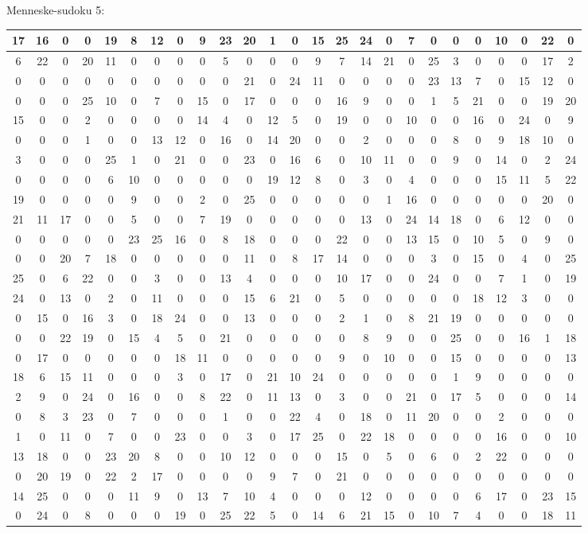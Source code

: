 \documentclass[]{report}
\begin{document}
Menneske-sudoku 5:\\
\begin{tabular}{|c|c|c|c|c||c|c|c|c|c||c|c|c|c|c||c|c|c|c|c||c|c|c|c|c|}
\hline
17&16&0&0&19&8&12&0&9&23&20&1&0&15&25&24&0&7&0&0&0&10&0&22&0\\\hline
6&22&0&20&11&0&0&0&0&5&0&0&0&9&7&14&21&0&25&3&0&0&0&17&2\\\hline
0&0&0&0&0&0&0&0&0&0&21&0&24&11&0&0&0&0&23&13&7&0&15&12&0\\\hline
0&0&0&25&10&0&7&0&15&0&17&0&0&0&16&9&0&0&1&5&21&0&0&19&20\\\hline
15&0&0&2&0&0&0&0&14&4&0&12&5&0&19&0&0&10&0&0&16&0&24&0&9\\\hline\hline
0&0&0&1&0&0&13&12&0&16&0&14&20&0&0&2&0&0&0&8&0&9&18&10&0\\\hline
3&0&0&0&25&1&0&21&0&0&23&0&16&6&0&10&11&0&0&9&0&14&0&2&24\\\hline
0&0&0&0&6&10&0&0&0&0&0&19&12&8&0&3&0&4&0&0&0&15&11&5&22\\\hline
19&0&0&0&0&9&0&0&2&0&25&0&0&0&0&0&1&16&0&0&0&0&0&20&0\\\hline
21&11&17&0&0&5&0&0&7&19&0&0&0&0&0&13&0&24&14&18&0&6&12&0&0\\\hline\hline
0&0&0&0&0&23&25&16&0&8&18&0&0&0&22&0&0&13&15&0&10&5&0&9&0\\\hline
0&0&20&7&18&0&0&0&0&0&11&0&8&17&14&0&0&0&3&0&15&0&4&0&25\\\hline
25&0&6&22&0&0&3&0&0&13&4&0&0&0&10&17&0&0&24&0&0&7&1&0&19\\\hline
24&0&13&0&2&0&11&0&0&0&15&6&21&0&5&0&0&0&0&0&18&12&3&0&0\\\hline
0&15&0&16&3&0&18&24&0&0&13&0&0&0&2&1&0&8&21&19&0&0&0&0&0\\\hline\hline
0&0&22&19&0&15&4&5&0&21&0&0&0&0&0&8&9&0&0&25&0&0&16&1&18\\\hline
0&17&0&0&0&0&0&18&11&0&0&0&0&0&9&0&10&0&0&15&0&0&0&0&13\\\hline
18&6&15&11&0&0&0&3&0&17&0&21&10&24&0&0&0&0&0&1&9&0&0&0&0\\\hline
2&9&0&24&0&16&0&0&8&22&0&11&13&0&3&0&0&21&0&17&5&0&0&0&14\\\hline
0&8&3&23&0&7&0&0&0&1&0&0&22&4&0&18&0&11&20&0&0&2&0&0&0\\\hline\hline
1&0&11&0&7&0&0&23&0&0&3&0&17&25&0&22&18&0&0&0&0&16&0&0&10\\\hline
13&18&0&0&23&20&8&0&0&10&12&0&0&0&15&0&5&0&6&0&2&22&0&0&0\\\hline
0&20&19&0&22&2&17&0&0&0&0&9&7&0&21&0&0&0&0&0&0&0&0&0&0\\\hline
14&25&0&0&0&11&9&0&13&7&10&4&0&0&0&12&0&0&0&0&6&17&0&23&15\\\hline
0&24&0&8&0&0&0&19&0&25&22&5&0&14&6&21&15&0&10&7&4&0&0&18&11\\\hline
\end{tabular}
\end{document}
